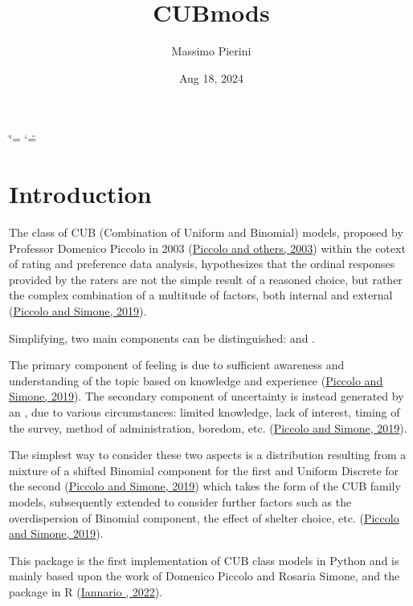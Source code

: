 \documentclass[letterpaper,10pt,english]{sphinxmanual}
\title{CUBmods}
\date{Aug 18, 2024}
\author{Massimo Pierini}
\begin{document}
\ifdefined\shorthandoff
  \ifnum\catcode`\=\string=\active\shorthandoff{=}\fi
  \ifnum\catcode`\"=\active{}\fi
\fi

\pagestyle{empty}
\sphinxmaketitle
\pagestyle{plain}
\sphinxtableofcontents
\pagestyle{normal}
\label{\detokenize{index::doc}}


\sphinxstepscope


\chapter{Introduction}
\label{\detokenize{intro:introduction}}\label{\detokenize{intro::doc}}
\sphinxAtStartPar
The class of CUB (Combination of Uniform and Binomial) models, proposed by Professor Domenico Piccolo in
2003 (\hyperlink{cite.intro:id17}{Piccolo and others, 2003}) within the cotext of rating and preference data analysis, hypothesizes that
the ordinal responses provided by the raters are not the simple result of a reasoned choice, but rather the
complex combination of a multitude of factors, both internal and external (\hyperlink{cite.intro:id16}{Piccolo and Simone, 2019}).

\sphinxAtStartPar
Simplifying, two main components can be distinguished:
 and .

\sphinxAtStartPar
The primary component of feeling
is due to sufficient awareness and understanding of the topic based on
knowledge and experience (\hyperlink{cite.intro:id16}{Piccolo and Simone, 2019}).
The secondary component of uncertainty is instead generated by an , due to
various circumstances: limited knowledge, lack of interest, timing of the survey, method of
administration, boredom, etc. (\hyperlink{cite.intro:id16}{Piccolo and Simone, 2019}).

\sphinxAtStartPar
The simplest way to consider these
two aspects is a distribution resulting from a
mixture of a shifted Binomial component for the first and Uniform Discrete for the
second (\hyperlink{cite.intro:id16}{Piccolo and Simone, 2019}) which takes the form of the CUB family models, subsequently
extended to consider further factors such as the overdispersion of
Binomial component, the effect of shelter choice, etc. (\hyperlink{cite.intro:id16}{Piccolo and Simone, 2019}).

\sphinxAtStartPar
This package is the first implementation of CUB class models in Python and is mainly based upon
the work of Domenico Piccolo and Rosaria Simone, and the  package in R (\hyperlink{cite.intro:id31}{Iannario , 2022}).
\end{document}
